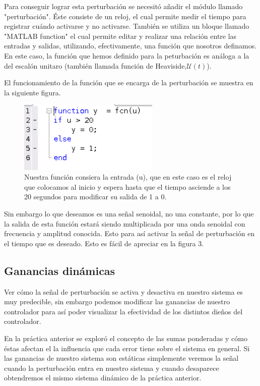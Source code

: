 \documentclass[12pt, letterpaper]{article}
\begin{document}
Para conseguir lograr esta perturbación se necesitó añadir el módulo llamado "perturbación". Éste consiste de un reloj, el cual permite medir el tiempo para registrar cuándo activarse y no activarse. También se utiliza un bloque llamado "MATLAB function" el cual permite editar y realizar una relación entre las entradas y salidas, utilizando, efectivamente, una función que nosotros definamos. En este caso, la función que hemos definido para la peturbación es análoga a la del escalón unitaro (también llamada función de Heaviside,$ \mathscr{U}(t)$).

El funcionamiento de la función que se encarga de la perturbación se muestra en la siguiente figura.

\begin{figure}[H]
	\centering
	\includegraphics[width=0.6\textwidth]{pertfunc.png}
	\caption{Nuestra función consiera la entrada (u), que en este caso es el reloj que colocamos al inicio y espera hasta que el tiempo asciende a los 20 segundos para modificar su salida de 1 a 0.}
\end{figure}

Sin embargo lo que deseamos es una señal senoidal, no una constante, por lo que la salida de esta función estará siendo multiplicada por una onda senoidal con frecuencia y amplitud conocida. Esto para así activar la señal de perturbación en el tiempo que es deseado. Esto es fácil de apreciar en la figura 3.
\subsection*{Ganancias dinámicas}
Ver cómo la señal de perturbación se activa y desactiva en nuestro sistema es muy predecible, sin embargo podemos modificar las ganancias de nuestro controlador para así poder visualizar la efectividad de los distintos dieños del controlador.

En la práctica anterior se exploró el concepto de las sumas ponderadas y cómo éstas afectan el la influencia que cada error tiene sobre el sistema en general. Si las ganancias de nuestro sistema son estáticas simplemente veremos la señal cuando la perturbación entra en nuestro sistema y cuando desaparece obtendremos el mismo sistema dinámico de la práctica anterior.
\end{document}
